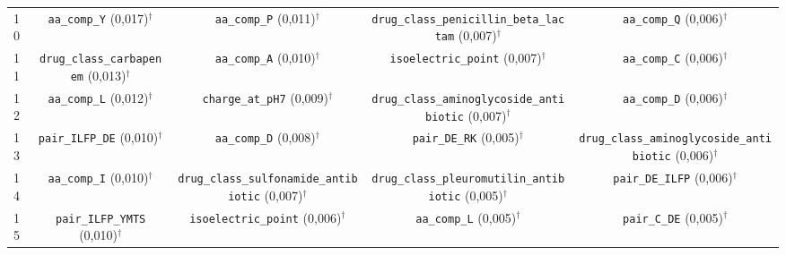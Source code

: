 \begin{table}[htbp]
\begin{tabular}{lcccc}
    10 & \texttt{aa\_comp\_Y} (0,017)$^\dagger$ & \texttt{aa\_comp\_P} (0,011)$^\dagger$ & \texttt{drug\_class\_penicillin\_beta\_lactam} (0,007)$^\dagger$ & \texttt{aa\_comp\_Q} (0,006)$^\dagger$ \\
    11 & \texttt{drug\_class\_carbapenem} (0,013)$^\dagger$ & \texttt{aa\_comp\_A} (0,010)$^\dagger$ & \texttt{isoelectric\_point} (0,007)$^\dagger$ & \texttt{aa\_comp\_C} (0,006)$^\dagger$ \\
    12 & \texttt{aa\_comp\_L} (0,012)$^\dagger$ & \texttt{charge\_at\_pH7} (0,009)$^\dagger$ & \texttt{drug\_class\_aminoglycoside\_antibiotic} (0,007)$^\dagger$ & \texttt{aa\_comp\_D} (0,006)$^\dagger$ \\
    13 & \texttt{pair\_ILFP\_DE} (0,010)$^\dagger$ & \texttt{aa\_comp\_D} (0,008)$^\dagger$ & \texttt{pair\_DE\_RK} (0,005)$^\dagger$ & \texttt{drug\_class\_aminoglycoside\_antibiotic} (0,006)$^\dagger$ \\
    14 & \texttt{aa\_comp\_I} (0,010)$^\dagger$ & \texttt{drug\_class\_sulfonamide\_antibiotic} (0,007)$^\dagger$ & \texttt{drug\_class\_pleuromutilin\_antibiotic} (0,005)$^\dagger$ & \texttt{pair\_DE\_ILFP} (0,006)$^\dagger$ \\
    15 & \texttt{pair\_ILFP\_YMTS} (0,010)$^\dagger$ & \texttt{isoelectric\_point} (0,006)$^\dagger$ & \texttt{aa\_comp\_L} (0,005)$^\dagger$ & \texttt{pair\_C\_DE} (0,005)$^\dagger$ \\
    \bottomrule
  \end{tabular}
\end{table}
